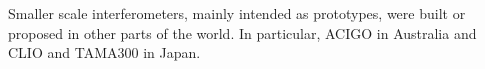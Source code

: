 Smaller scale interferometers, mainly intended as prototypes, were built or 
proposed in other parts of the world. In particular, ACIGO in Australia and 
CLIO and TAMA300 in Japan.

